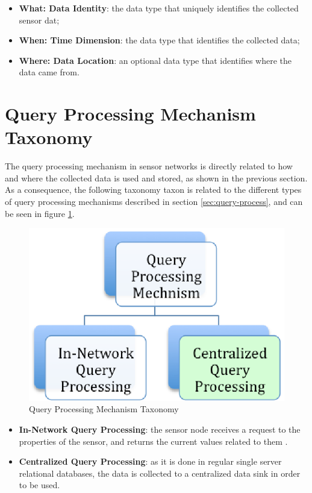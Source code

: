 \begin{itemize}
  \item \textbf{What: Data Identity}: the data type that uniquely identifies
  the collected sensor dat;
  \item \textbf{When: Time Dimension}: the data type that identifies the
  collected data;
  \item \textbf{Where: Data Location}: an optional data type that identifies
  where the data came from.
\end{itemize}

\section{Query Processing Mechanism Taxonomy}

The query processing mechanism in sensor networks is directly related to how
and where the collected data is used and stored, as shown in the previous
section. As a consequence, the following taxonomy taxon is related to the
different types of query processing mechanisms described in section
\ref{sec:query-process}, and can be seen in figure
\ref{fig:taxonomy-query-mechanism}.

\begin{figure}[h]
  \centering
  \includegraphics{../diagrams/taxonomy-query-mechanism}
  \caption{Query Processing Mechanism Taxonomy}
  \label{fig:taxonomy-query-mechanism}
\end{figure}

\begin{itemize}
  \item \textbf{In-Network Query Processing}: the sensor node receives a
  request to the properties of the sensor, and returns the current values
  related to them \cite{sn-intro01}.
  \item \textbf{Centralized Query Processing}: as it is done in regular single
  server relational databases, the data is collected to a centralized data
  sink in order to be used.
\end{itemize}

